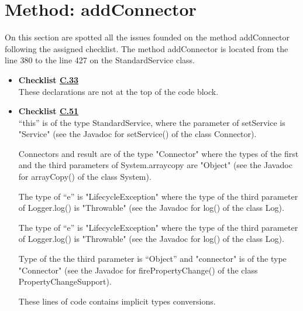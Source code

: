 \documentclass[../../../../codeInspection.tex]{subfiles}
\begin{document}
	\section{Method: addConnector}

		On this section are spotted all the issues founded on the method addConnector following the assigned checklist.
		The method addConnector is located from the line 380 to the line 427 on the StandardService class.

		\begin{itemize}
			\item \textbf{Checklist \hyperref[C:33]{C.33}} \\

				  

				  These declarations are not at the top of the code block.

			\item \textbf{Checklist \hyperref[C:51]{C.51}} \\

				  

				  “this” is of the type StandardService, where the parameter of setService is "Service"
				  (see the Javadoc for setService() of the class Connector).

				  

				  Connectors and result are of the type "Connector" where the types of the first and the third parameters of System.arraycopy are "Object" (see the Javadoc for arrayCopy() of the class System).

				  

				  The type of “e” is "LifecycleException" where the type of the third parameter of Logger.log() is "Throwable" (see the Javadoc for log() of the class Log).

				  

				  The type of “e” is "LifecycleException" where the type of the third parameter of Logger.log() is "Throwable" (see the Javadoc for log() of the class Log).

				  

				  Type of the the third parameter is “Object” and "connector" is of the type "Connector" (see the Javadoc for firePropertyChange() of the class PropertyChangeSupport).

				  These lines of code contains implicit types conversions.

		\end{itemize}
\end{document}

